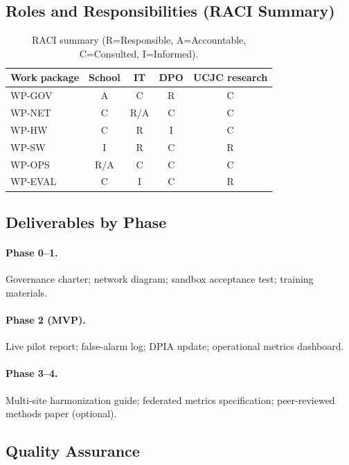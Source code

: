 \subsection{Roles and Responsibilities (RACI Summary)}

\begin{table}[htbp]
  \centering
  \caption{RACI summary (R=Responsible, A=Accountable, C=Consulted, I=Informed).}
  \label{tab:raci}
  \footnotesize
  \begin{tabular}{@{}lcccc@{}}
    \toprule
    Work package & School & IT & DPO & UCJC research \\
    \midrule
    WP-GOV & A & C & R & C \\
    WP-NET & C & R/A & C & C \\
    WP-HW & C & R & I & C \\
    WP-SW & I & R & C & R \\
    WP-OPS & R/A & C & C & C \\
    WP-EVAL & C & I & C & R \\
    \bottomrule
  \end{tabular}
\end{table}

\subsection{Deliverables by Phase}

\paragraph{Phase 0--1.}
Governance charter; network diagram; sandbox acceptance test; training materials.

\paragraph{Phase 2 (MVP).}
Live pilot report; false-alarm log; DPIA update; operational metrics dashboard.

\paragraph{Phase 3--4.}
Multi-site harmonization guide; federated metrics specification; peer-reviewed methods paper (optional).

\subsection{Quality Assurance}

